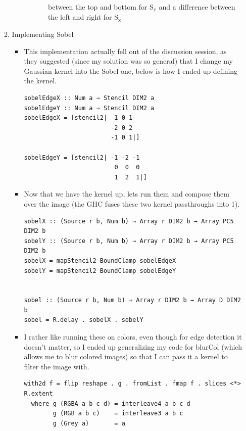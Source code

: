 \documentclass{article}
\begin{document}
\begin{enumerate}
\begin{enumerate}
\begin{itemize}
\begin{itemize}
\begin{itemize}
between the top and bottom for S$_{\text{y}}$ and a difference between the
left and right for S$_{\text{x}}$
\end{itemize}
\end{itemize}
\end{itemize}
\item Implementing Sobel
\label{sec-1-1-2}
\begin{itemize}
\item This implementation actually fell out of the discussion session, as
they suggested (since my solution was so general) that I change my
Gaussian kernel into the Sobel one, below is how I ended up defining
the kernel.
\begin{verbatim}
sobelEdgeX :: Num a ⇒ Stencil DIM2 a
sobelEdgeY :: Num a ⇒ Stencil DIM2 a
sobelEdgeX = [stencil2| -1 0 1
                        -2 0 2
                        -1 0 1|]

sobelEdgeY = [stencil2| -1 -2 -1
                         0  0  0
                         1  2  1|]
\end{verbatim}

\item Now that we have the kernel up, lets run them and compose them over the
image (the GHC fuses these two kernel passthroughs into 1).
\begin{verbatim}
sobelX :: (Source r b, Num b) ⇒ Array r DIM2 b → Array PC5 DIM2 b
sobelY :: (Source r b, Num b) ⇒ Array r DIM2 b → Array PC5 DIM2 b
sobelX = mapStencil2 BoundClamp sobelEdgeX
sobelY = mapStencil2 BoundClamp sobelEdgeY


sobel :: (Source r b, Num b) ⇒ Array r DIM2 b → Array D DIM2 b
sobel = R.delay . sobelX . sobelY
\end{verbatim}

\item I rather like running these on colors, even though for edge
detection it doesn't matter, so I ended up generalizing my code for
blurCol (which allows me to blur colored images) so that I can
pass it a kernel to filter the image with.
\begin{verbatim}
with2d f = flip reshape . g . fromList . fmap f . slices <*> R.extent
  where g (RGBA a b c d) = interleave4 a b c d
        g (RGB a b c)    = interleave3 a b c
        g (Grey a)       = a


\end{verbatim}
\end{itemize}
\end{enumerate}
\end{enumerate}
\end{document}
